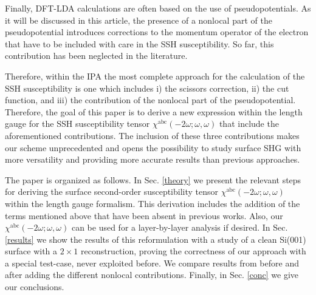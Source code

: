 \documentclass[floatfix,prb,aps,superscriptaddress,showpacs,letterpaper]{revtex4}
\begin{document}
Finally, DFT-LDA calculations are often based on the use of pseudopotentials.
As it will be discussed 
in this article, the presence of a nonlocal part of the
pseudopotential introduces
corrections to
the momentum operator of the electron that have to be included with care in 
the SSH susceptibility. So far, this contribution has been neglected in the 
literature.

Therefore, within the IPA the most complete approach for the calculation of 
the SSH susceptibility is one which includes i) the scissors correction, 
ii) the cut function, and iii) the contribution of the nonlocal part of the 
pseudopotential. Therefore, the goal of this paper is to derive a new 
expression within the length gauge for the SSH susceptibility tensor 
$\chi^{\mathrm{a}\mathrm{b}\mathrm{c}}(-2\omega;\omega,\omega)$ 
that include the aforementioned contributions. The inclusion of these three 
contributions makes our scheme unprecedented and opens the possibility to 
study surface SHG with more versatility and providing more accurate results 
than previous approaches. 

The paper is organized as follows. In Sec. \ref{theory} we present the 
relevant steps for deriving the surface second-order susceptibility tensor
$\chi^{\mathrm{a}\mathrm{b}\mathrm{c}}(-2\omega;\omega,\omega)$ within the 
length gauge formalism. This derivation includes the addition of the terms 
mentioned above that have been absent in previous works. Also, our 
$\chi^{\mathrm{a}\mathrm{b}\mathrm{c}}(-2\omega;\omega,\omega)$ can be used 
for a layer-by-layer analysis if desired. In Sec. \ref{results} we show the 
results of this reformulation with a study of a clean Si(001) surface with a 
$2 \times 1$ reconstruction, 
proving the correctness of our approach with a special test-case,
never exploited before.
We compare results from before and after adding 
the different nonlocal contributions. Finally, in Sec. \ref{conc} we give 
our conclusions.

\end{document}
